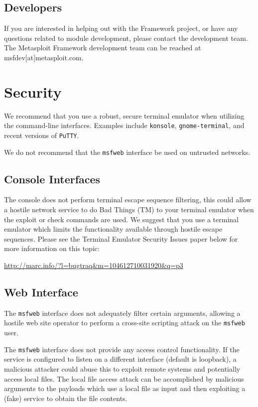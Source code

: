 \documentclass{report}
\begin{document}
\section{Developers}
\par
If you are interested in helping out with the Framework project, or have any
questions related to module development, please contact the development team. The
Metasploit Framework development team can be reached at msfdev[at]metasploit.com.

\pagebreak
\appendix

\pagebreak
\chapter{Security}

\par
We recommend that you use a robust, secure terminal emulator when
utilizing the command-line interfaces. Examples include \texttt{konsole},
\texttt{gnome-terminal}, and recent versions of \texttt{PuTTY}.

\par
We do not recommend that the \texttt{msfweb} interface be used on untrusted
networks. 

	\section{Console Interfaces}
\par
The console does not perform terminal escape sequence filtering, this
could allow a hostile network service to do Bad Things (TM) to your terminal
emulator when the exploit or check commands are used. We suggest that you
use a terminal emulator which limits the functionality available through
hostile escape sequences. Please see the Terminal Emulator Security Issues paper
below for more information on this topic:

\url{http://marc.info/?l=bugtraq&m=104612710031920&q=p3}


	\section{Web Interface}
\par
The \texttt{msfweb} interface does not adequately filter certain arguments,
allowing a hostile web site operator to perform a cross-site scripting
attack on the \texttt{msfweb} user.

\par
The \texttt{msfweb} interface does not provide any access control functionality. If
the service is configured to listen on a different interface (default is
loopback), a malicious attacker could abuse this to exploit remote systems
and potentially access local files. The local file access attack can be
accomplished by malicious arguments to the payloads which use a local file
as input and then exploiting a (fake) service to obtain the file contents.
	
\end{document}
